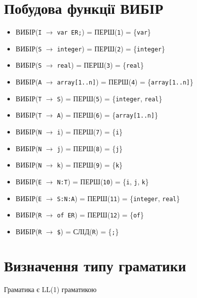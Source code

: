 \section{Побудова функції ВИБІР}
\begin{itemize}
    \item[]  ВИБІР(\verb|I| $\to$ \verb|var ER;|)      = ПЕРШ(\verb|1|)  = \{\verb|var|\}
    \item[]  ВИБІР(\verb|S| $\to$ \verb|integer|)      = ПЕРШ(\verb|2|)  = \{\verb|integer|\}
    \item[]  ВИБІР(\verb|S| $\to$ \verb|real|)         = ПЕРШ(\verb|3|)  = \{\verb|real|\}
    \item[]  ВИБІР(\verb|A| $\to$ \verb|array[1..n]|)  = ПЕРШ(\verb|4|)  = \{\verb|array[1..n]|\}
    \item[]  ВИБІР(\verb|T| $\to$ \verb|S|)            = ПЕРШ(\verb|5|)  = \{\verb|integer|, \verb|real|\}
    \item[]  ВИБІР(\verb|T| $\to$ \verb|A|)            = ПЕРШ(\verb|6|)  = \{\verb|array[1..n]|\}
    \item[]  ВИБІР(\verb|N| $\to$ \verb|i|)            = ПЕРШ(\verb|7|)  = \{\verb|i|\}
    \item[]  ВИБІР(\verb|N| $\to$ \verb|j|)            = ПЕРШ(\verb|8|)  = \{\verb|j|\}
    \item[]  ВИБІР(\verb|N| $\to$ \verb|k|)            = ПЕРШ(\verb|9|)  = \{\verb|k|\}
    \item[]  ВИБІР(\verb|E| $\to$ \verb|N:T|)          = ПЕРШ(\verb|10|) = \{\verb|i|, \verb|j|, \verb|k|\}
    \item[]  ВИБІР(\verb|E| $\to$ \verb|S:N:A|)        = ПЕРШ(\verb|11|) = \{\verb|integer|, \verb|real|\}
    \item[]  ВИБІР(\verb|R| $\to$ \verb|of ER|)        = ПЕРШ(\verb|12|) = \{\verb|of|\}
    \item[]  ВИБІР(\verb|R| $\to$ \verb|$|)            = СЛІД(\verb|R|)  = \{\verb|;|\}
\end{itemize}


\section{Визначення типу граматики}
Граматика є LL(1) граматикою


\newpage
